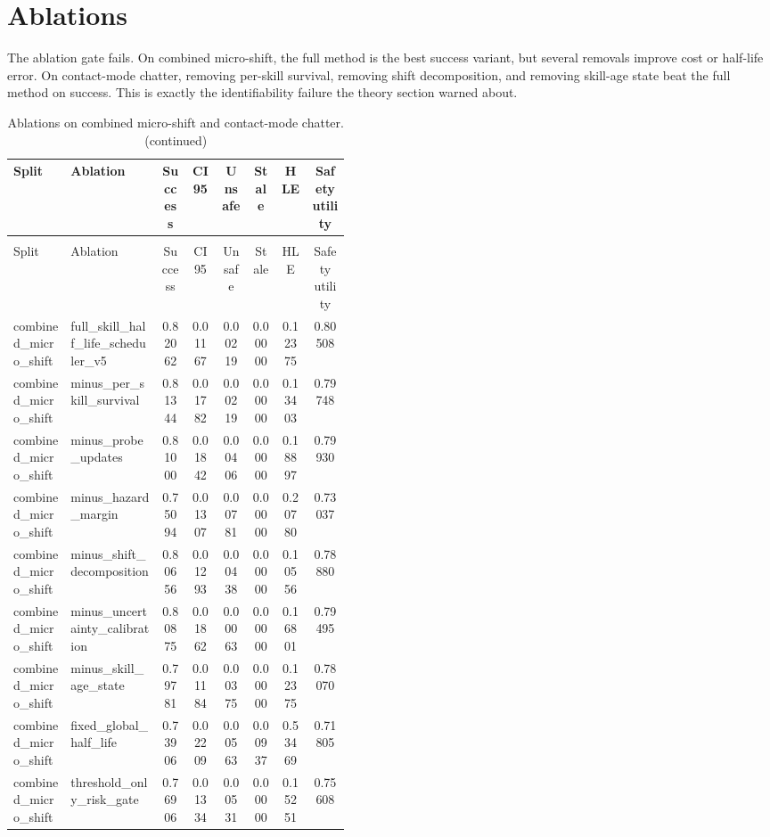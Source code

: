 \documentclass{article}
\begin{document}
\section{Ablations}

The ablation gate fails. On combined micro-shift, the full method is the best success variant, but several removals improve cost or half-life error. On contact-mode chatter, removing per-skill survival, removing shift decomposition, and removing skill-age state beat the full method on success. This is exactly the identifiability failure the theory section warned about.

\begin{center}
\scriptsize
\begin{longtable}{p{0.17\linewidth}p{0.27\linewidth}cccccc}
\caption{Ablations on combined micro-shift and contact-mode chatter.}\label{tab:ablations}\\
\toprule
Split & Ablation & Success & CI95 & Unsafe & Stale & HLE & Safety utility\\
\midrule
\endfirsthead
\caption[]{Ablations on combined micro-shift and contact-mode chatter. (continued)}\\
\toprule
Split & Ablation & Success & CI95 & Unsafe & Stale & HLE & Safety utility\\
\midrule
\endhead
combined\_micro\_shift & full\_skill\_half\_life\_scheduler\_v5 & 0.82062 & 0.01167 & 0.00219 & 0.00000 & 0.12375 & 0.80508\\
combined\_micro\_shift & minus\_per\_skill\_survival & 0.81344 & 0.01782 & 0.00219 & 0.00000 & 0.13403 & 0.79748\\
combined\_micro\_shift & minus\_probe\_updates & 0.81000 & 0.01842 & 0.00406 & 0.00000 & 0.18897 & 0.79930\\
combined\_micro\_shift & minus\_hazard\_margin & 0.75094 & 0.01307 & 0.00781 & 0.00000 & 0.20780 & 0.73037\\
combined\_micro\_shift & minus\_shift\_decomposition & 0.80656 & 0.01293 & 0.00438 & 0.00000 & 0.10556 & 0.78880\\
combined\_micro\_shift & minus\_uncertainty\_calibration & 0.80875 & 0.01862 & 0.00063 & 0.00000 & 0.16801 & 0.79495\\
combined\_micro\_shift & minus\_skill\_age\_state & 0.79781 & 0.01184 & 0.00375 & 0.00000 & 0.12375 & 0.78070\\
combined\_micro\_shift & fixed\_global\_half\_life & 0.73906 & 0.02209 & 0.00563 & 0.00937 & 0.53469 & 0.71805\\
combined\_micro\_shift & threshold\_only\_risk\_gate & 0.76906 & 0.01334 & 0.00531 & 0.00000 & 0.15251 & 0.75608\\

\end{longtable}
\end{center}
\end{document}
